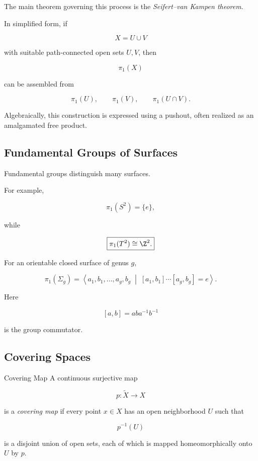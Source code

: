 The main theorem governing this process is the
\emph{Seifert--van Kampen theorem}.

In simplified form, if

\[
X=U\cup V
\]

with suitable path-connected open sets \(U,V\), then

\[
\pi_1(X)
\]

can be assembled from

\[
\pi_1(U),
\qquad
\pi_1(V),
\qquad
\pi_1(U\cap V).
\]

Algebraically, this construction is expressed using a pushout, often
realized as an amalgamated free product.

\subsection{Fundamental Groups of Surfaces}
\label{subsec:fundamental-groups-surfaces}

Fundamental groups distinguish many surfaces.

For example,

\[
\boxed{
\pi_1(S^2)=\{e\},
}
\]

while

\[
\boxed{
\pi_1(T^2)
\cong
\Z^2.
}
\]

For an orientable closed surface of genus \(g\),

\[
\boxed{
\pi_1(\Sigma_g)
=
\left\langle
a_1,b_1,\ldots,a_g,b_g
\;\middle|\;
[a_1,b_1]\cdots[a_g,b_g]=e
\right\rangle.
}
\]

Here

\[
[a,b]
=
aba^{-1}b^{-1}
\]

is the group commutator.

\subsection{Covering Spaces}
\label{subsec:covering-spaces}

\begin{definitionbox}{Covering Map}
A continuous surjective map

\[
p:\widetilde{X}\to X
\]

is a \emph{covering map} if every point \(x\in X\) has an open neighborhood
\(U\) such that

\[
p^{-1}(U)
\]

is a disjoint union of open sets, each of which is mapped homeomorphically
onto \(U\) by \(p\).
\end{definitionbox}

